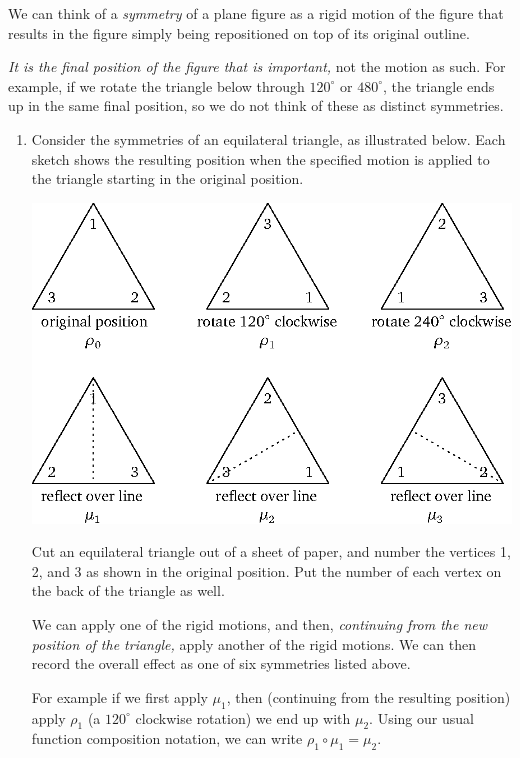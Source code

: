 We can think of a \textit{symmetry} of a plane figure as a rigid motion of the figure that results in the figure simply being repositioned on top of its original outline.

\textit{It is the final position of the figure that is important,} not the motion as such. For example, if we rotate the triangle below through $120^\circ$ or $480^\circ$, the triangle ends up in the same final position, so we do not think of these as distinct symmetries.

\begin{enumerate}
    \item Consider the symmetries of an equilateral triangle, as illustrated below. Each sketch shows the resulting position when the specified motion is applied to the triangle starting in the original position.
\begin{center}
    \includegraphics{wstriangles.eps}
\end{center}
    Cut an equilateral triangle out of a sheet of paper, and number the vertices 1, 2, and 3 as shown in the original position. Put the number of each vertex on the back of the triangle as well.

    We can apply one of the rigid motions, and then, \textit{continuing from the new position of the triangle,} apply another of the rigid motions. We can then record the overall effect as one of six symmetries listed above.

    For example if we first apply $\mu_1$, then (continuing from the resulting position) apply $\rho_1$ (a $120^\circ$ clockwise rotation) we end up with $\mu_2$. Using our usual function composition notation, we can write $\rho_1 \circ \mu_1 = \mu_2$.


\end{enumerate}
